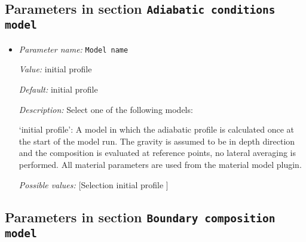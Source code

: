 \subsection{Parameters in section \tt Adiabatic conditions model}
\label{parameters:Adiabatic_20conditions_20model}

\begin{itemize}
\item {\it Parameter name:} {\tt Model name}
\label{parameters:Adiabatic conditions model/Model name}


{\it Value:} initial profile


{\it Default:} initial profile


{\it Description:} Select one of the following models:

`initial profile': A model in which the adiabatic profile is calculated once at the start of the model run. The gravity is assumed to be in depth direction and the composition is evaluated at reference points, no lateral averaging is performed. All material parameters are used from the material model plugin.


{\it Possible values:} [Selection initial profile ]
\end{itemize}

\subsection{Parameters in section \tt Boundary composition model}
\label{parameters:Boundary_20composition_20model}

